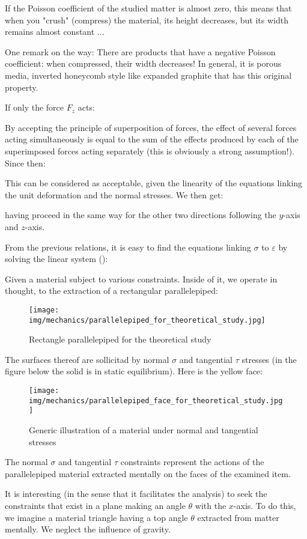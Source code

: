 	If the Poisson coefficient of the studied matter is almost zero, this means that when you "crush" (compress) the material, its height decreases, but its width remains almost constant ...

	One remark on the way: There are products that have a negative Poisson coefficient: when compressed, their width decreases! In general, it is porous media, inverted honeycomb style like  expanded graphite that has this original property.

	If only the force $F_z$ acts:
	
	By accepting the principle of superposition of forces, the effect of several forces acting simultaneously is equal to the sum of the effects produced by each of the superimposed forces acting separately (this is obviously a strong assumption!). Since then:
	
	This can be considered as acceptable, given the linearity of the equations linking the unit deformation  and the normal stresses. We then get:
	
	having proceed in the same way for the other two directions following the $y$-axis and $z$-axis.
	
	From the previous relations, it is easy to find the equations linking $\sigma$ to $\varepsilon$ by solving the linear system ():
	
	Given a material subject to various constraints. Inside of it, we operate in thought, to the extraction of a rectangular parallelepiped:
	\begin{figure}[H]
		\centering
		\texttt{[image: img/mechanics/parallelepiped\_for\_theoretical\_study.jpg]}
		\caption[]{Rectangle parallelepiped for the theoretical study}
	\end{figure}
	The surfaces thereof are sollicitad by normal $\sigma$ and tangential  $\tau$ stresses (in the figure below the solid  is in static equilibrium). Here is the yellow face:
	\begin{figure}[H]
		\centering
		\texttt{[image: img/mechanics/parallelepiped\_face\_for\_theoretical\_study.jpg]}
		\caption[]{Generic illustration of a material under normal and tangential stresses}
	\end{figure}
	The normal $\sigma$ and tangential $\tau$ constraints represent the actions of the parallelepiped material extracted mentally on the faces of the examined item.
	
	It is interesting (in the sense that it facilitates the analysis) to seek the constraints that exist in a plane making an angle $\theta$ with the $x$-axis. To do this, we imagine a material triangle having a top angle $\theta$ extracted from matter mentally. We neglect the influence of gravity.
	
